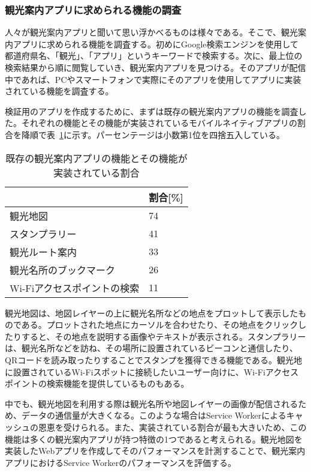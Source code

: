 \subsubsection{観光案内アプリに求められる機能の調査}\label{subsubsection:観光案内アプリに求められる機能の調査}
人々が観光案内アプリと聞いて思い浮かべるものは様々である。そこで、観光案内アプリに求められる機能を調査する。初めにGoogle検索エンジンを使用して都道府県名、「観光」、「アプリ」というキーワードで検索する。次に、最上位の検索結果から順に閲覧していき、観光案内アプリを見つける。そのアプリが配信中であれば、PCやスマートフォンで実際にそのアプリを使用してアプリに実装されている機能を調査する。

検証用のアプリを作成するために、まずは既存の観光案内アプリの機能を調査した。それぞれの機能とその機能が実装されているモバイルネイティブアプリの割合を降順で表~\ref{table:既存の観光案内アプリの機能とその機能が実装されている割合}に示す。パーセンテージは小数第1位を四捨五入している。
\begin{table}
  \caption{既存の観光案内アプリの機能とその機能が実装されている割合}\label{table:既存の観光案内アプリの機能とその機能が実装されている割合}
  \centering
  \begin{tabular}{|p{15em}|p{10em}|}
    \hline
    & 割合[\%] \\ \hline
    観光地図 & 74 \\ \hline
    スタンプラリー & 41\\ \hline
    観光ルート案内 & 33\\ \hline
    観光名所のブックマーク & 26\\ \hline
    Wi-Fiアクセスポイントの検索 & 11 \\ \hline
  \end{tabular}
\end{table}
観光地図は、地図レイヤーの上に観光名所などの地点をプロットして表示したものである。プロットされた地点にカーソルを合わせたり、その地点をクリックしたりすると、その地点を説明する画像やテキストが表示される。スタンプラリーは、観光名所などを訪ね、その場所に設置されているビーコンと通信したり、QRコードを読み取ったりすることでスタンプを獲得できる機能である。観光地に設置されているWi-Fiスポットに接続したいユーザー向けに、Wi-Fiアクセスポイントの検索機能を提供しているものもある。

中でも、観光地図を利用する際は観光名所や地図レイヤーの画像が配信されるため、データの通信量が大きくなる。このような場合はService Workerによるキャッシュの恩恵を受けられる。また、実装されている割合が最も大きいため、この機能は多くの観光案内アプリが持つ特徴の1つであると考えられる。観光地図を実装したWebアプリを作成してそのパフォーマンスを計測することで、観光案内アプリにおけるService Workerのパフォーマンスを評価する。
